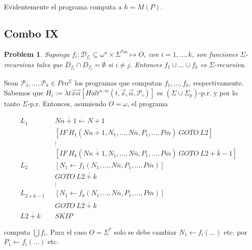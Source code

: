 \documentclass[a4paper, 12pt]{article}
\newtheorem{problem}{Problem}
\newtheorem{problem}{Problem}
\begin{document}
Evidentemente el programa computa a $h = M(P)$.

\pagebreak 

\subsection{Combo IX}

\begin{problem}
    Suponga $f_i : \mathcal{D}_{f_i} \subseteq \omega^{n} \times \Sigma^{*m}
    \mapsto O$, con $i = 1,\ldots, k$, son funciones $\Sigma$-recursivas tales
    que $D_{f_i} \cap D_{f_j} = \emptyset$ si $i \neq j$. Entonces $f_1 \cup
    \ldots \cup f_k$ es $\Sigma$-recursiva. 
\end{problem}

Sean $\mathcal{P}_1, \ldots, \mathcal{P}_k \in Pro^{\Sigma}$ los programas que
computan $f_1, \ldots, f_k$, respectivamente. Sabemos que $H_i := \lambda t
\vec{x}\vec{\alpha} \left[ Halt^{n, m}(t, \vec{x}, \vec{\alpha}, \mathcal{P}_i)  \right]$
es $(\Sigma \cup \Sigma_p)$-p.r. y por lo tanto $\Sigma$-p.r. Entonces,
asumiendo $O = \omega$, el
programa 

\begin{align*}
    L_{1} ~ ~ ~ &N \overline{n+1} \leftarrow N+1 \\ 
                 &[IF ~ H_1(N\overline{n+1}, N_1, \ldots, N\overline{n}, P_1,
                 \ldots, P\overline{m}) ~ GOTO ~ L 2]\\
                 &\vdots\\
                 &[IF ~ H_k(N\overline{n+1}, N_1, \ldots, N\overline{n}, P_1,
                 \ldots, P\overline{m}) ~ GOTO ~ L \overline{2 + k - 1}]\\ 
    L_2 ~ ~ ~ & [N_1 \leftarrow  f_1(N_1, \ldots, N\overline{n}, P_1, \ldots,
    P\overline{m})] \\ 
              &GOTO ~ L\overline{2+k}\\
              &\vdots \\ 
    L_\overline{2 + k - 1} ~ ~ ~ & [N_1 \leftarrow  f_k(N_1, \ldots, N\overline{n}, P_1, \ldots,
    P\overline{m})] \\ 
              &GOTO ~ L\overline{2+k}\\ 
    L\overline{2+k} ~ ~ ~ & SKIP
\end{align*}

computa $\bigcup f_i$. Para el caso $O = \Sigma^{*}$ solo se debe cambiar $N_1
\leftarrow  f_i(\ldots)$ etc. por $P_1 \leftarrow  f_i(\ldots)$ etc.
\end{document}
